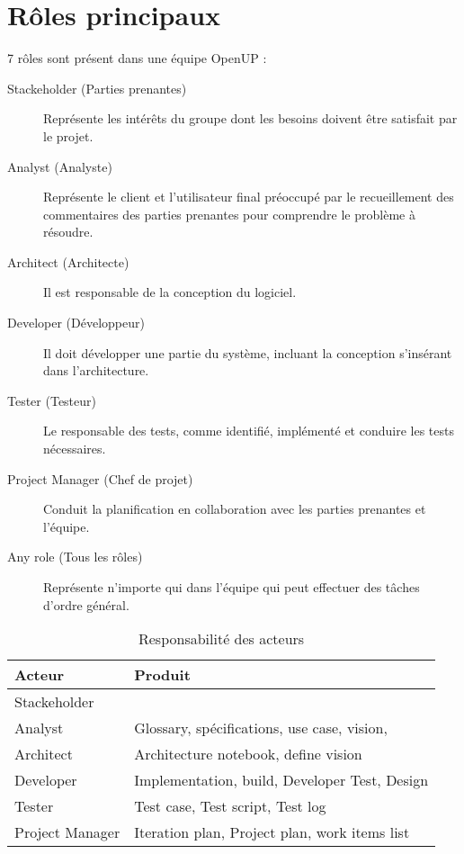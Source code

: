 \documentclass[a4paper, 11pt]{article}
\begin{document}
\section{Rôles principaux}
7 rôles sont présent dans une équipe OpenUP : 
\begin{description}
	\item[Stackeholder (Parties prenantes)] Représente les intérêts du groupe dont les besoins doivent être satisfait par le projet.
	\item[Analyst (Analyste)] Représente le client et l'utilisateur final préoccupé par le recueillement des commentaires des
		parties prenantes pour comprendre le problème à résoudre. 
	\item[Architect (Architecte)] Il est responsable de la conception du logiciel. 
	\item[Developer (Développeur)] Il doit développer une partie du système, incluant la conception s'insérant dans l'architecture.
	\item[Tester (Testeur)] Le responsable des tests, comme identifié, implémenté et conduire les tests nécessaires. 
	\item[Project Manager (Chef de projet)] Conduit la planification en collaboration avec les parties prenantes et l'équipe.
	\item[Any role (Tous les rôles)] Représente n'importe qui dans l'équipe qui peut effectuer des tâches d'ordre général.
\end{description}
\begin{table}[H]
	\begin{tabular}{l |p{10cm}}
	\textbf{Acteur}  & \textbf{Produit}\\
\hline
Stackeholder& \\
Analyst&  Glossary, spécifications, use case, vision, \\
Architect& Architecture notebook, define vision\\
Developer&  Implementation, build, Developer Test, Design\\
Tester& Test case, Test script, Test log\\
Project Manager& Iteration plan, Project plan, work items list\\
\end{tabular}
\caption{Responsabilité des acteurs}
\end{table}
\end{document}
